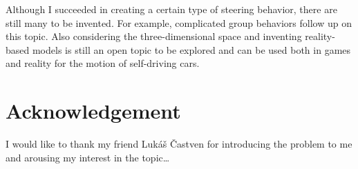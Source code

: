 \documentclass[10pt,twoside,english,a4paper]{article}
\begin{document}
Although I succeeded in creating a certain type of steering behavior,
there are still many to be invented. For example, complicated group behaviors
follow up on this topic. Also considering the three-dimensional space
and inventing reality-based models is still an open topic to be explored
and can be used both in games and reality for the motion of 
self-driving cars.

\section*{Acknowledgement}
I would like to thank my friend Lukáš Častven for introducing 
the problem to me and arousing my interest in the topic\ldots

 
  
\end{document}
